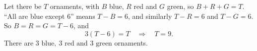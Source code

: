Let there be $T$ ornaments, with $B$ blue, $R$ red and $G$ green, so $B+R+G=T$. ``All are blue except $6$'' means $T-B=6$, and similarly $T-R=6$ and $T-G=6$. So $B=R=G=T-6$, and
\[
3(T-6)=T\quad\Longrightarrow\quad T=9 .
\]
There are $\boxed{3\text{ blue},\ 3\text{ red and }3\text{ green}}$ ornaments.
